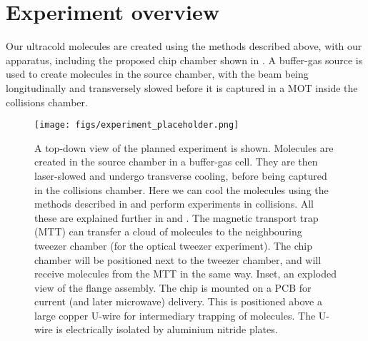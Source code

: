 
\section{Experiment overview}
\label{overview:overview}

Our ultracold molecules are created using the methods described above, with our
apparatus, including the proposed chip chamber shown in
. A buffer-gas source is used to create
\CaF{} molecules in the source chamber, with the beam being longitudinally and
transversely slowed before it is captured in a MOT inside the collisions
chamber.

\begin{figure}[htb]
  \centering
  \texttt{[image: figs/experiment\_placeholder.png]}
  \caption{
    A top-down view of the planned \CaF{} experiment is shown. Molecules are
    created in the source chamber in a buffer-gas cell. They are then
    laser-slowed  and undergo transverse
    cooling, before being captured in the collisions chamber.
    Here we can cool the
    molecules using the methods described in and perform
    experiments in collisions. All these are explained further in  and . The magnetic transport
    trap (MTT) can transfer a cloud of molecules to the neighbouring tweezer
    chamber (for the optical tweezer experiment). The chip chamber will be
    positioned next to the tweezer chamber, and will receive molecules from the
    MTT in the same way. Inset, an exploded view of the flange assembly. The
    chip is mounted on a PCB for current (and later microwave) delivery. This
    is positioned above a large copper U-wire for intermediary trapping of
    molecules. The U-wire is electrically isolated by aluminium nitride
    plates.}
  \label{overview:fig:vacuumsystem}
\end{figure}

